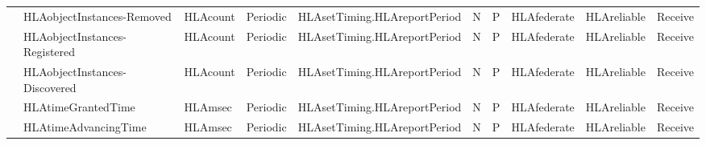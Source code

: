 \begin{landscape}
\begin{momtabletypeset}[8.00]
{{\begin{tabular}{|Y{90.88pt}|Y{96.62pt}|Y{69.32pt}|Y{45.50pt}|Y{96.56pt}|Y{24.62pt}|Y{24.62pt}|Y{48.56pt}|Y{65.24pt}|Y{36.31pt}|}
                    & HLAobjectInstances-\newline Removed          & HLAcount                                    & Periodic                                                   & HLAsetTiming.\allowbreak{}\newline HLAreportPeriod & N & P & HLAfederate & HLAreliable & Receive \\
                    & HLAobjectInstances-\newline Registered       & HLAcount                                    & Periodic                                                   & HLAsetTiming.\allowbreak{}\newline HLAreportPeriod & N & P & HLAfederate & HLAreliable & Receive \\
                    & HLAobjectInstances-\newline Discovered       & HLAcount                                    & Periodic                                                   & HLAsetTiming.\allowbreak{}\newline HLAreportPeriod & N & P & HLAfederate & HLAreliable & Receive \\
                    & HLAtimeGrantedTime                           & HLAmsec                                     & Periodic                                                   & HLAsetTiming.\allowbreak{}\newline HLAreportPeriod & N & P & HLAfederate & HLAreliable & Receive \\
                    & HLAtimeAdvancingTime                         & HLAmsec                                     & Periodic                                                   & HLAsetTiming.\allowbreak{}\newline HLAreportPeriod & N & P & HLAfederate & HLAreliable & Receive \\
                    \hline
                \end{tabular}%
            }%
        }%
    \end{momtabletypeset}
    \newpage


\end{landscape}
